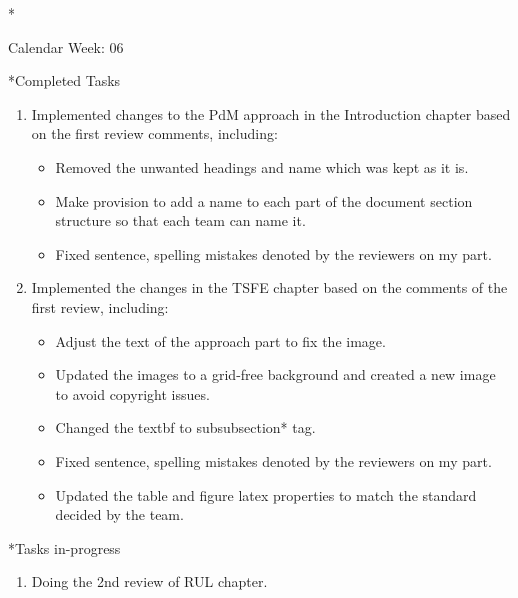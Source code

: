 \documentclass[11pt,a4paper]{article}
\begin{document}
\newpage
\begin{section}*{Calendar Week: 06 \hfill \date{12 February, 2021}}
 \begin{subsection}*{Completed Tasks}
     \begin{enumerate}
         \item
               Implemented changes to the PdM approach in the Introduction chapter based on the first review comments, including:
               \begin{itemize}
                   \item
                         Removed the unwanted headings and name which was kept as it is.
                   \item
                         Make provision to add a name to each part of the document section structure so that each team can name it.
                   \item
                         Fixed sentence, spelling mistakes denoted by the reviewers on my part.
               \end{itemize}
         \item
               Implemented the changes in the TSFE chapter based on the comments of the first review, including:
               \begin{itemize}
                   \item
                         Adjust the text of the approach part to fix the image.
                   \item
                         Updated the images to a grid-free background and created a new image to avoid copyright issues.
                   \item
                         Changed the textbf to subsubsection* tag.
                   \item
                         Fixed sentence, spelling mistakes denoted by the reviewers on my part.
                   \item
                         Updated the table and figure latex properties to match the standard decided by the team.
               \end{itemize}
     \end{enumerate}
 \end{subsection}

 \begin{subsection}*{Tasks in-progress}
     \begin{enumerate}
         \item
               Doing the 2nd review of RUL chapter.
     \end{enumerate}
 \end{subsection}
\end{section}
\end{document}

